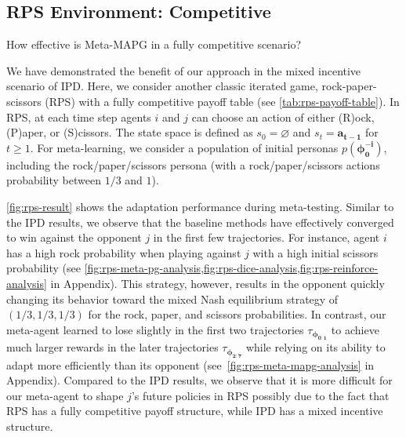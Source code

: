 \subsection{RPS Environment: Competitive}
\begin{question}
How effective is Meta-MAPG in a fully competitive scenario? \\[-2em]
\end{question}
We have demonstrated the benefit of our approach in the mixed incentive scenario of IPD. Here, we consider another classic iterated game, rock-paper-scissors (RPS) with a fully competitive payoff table (see \cref{tab:rps-payoff-table}). 
In RPS, at each time step agents $i$ and $j$ can choose an action of either (R)ock, (P)aper, or (S)cissors. The state space is defined as $s_{0}\!=\!\varnothing$ and $s_{t}\!=\!\bm{a}_{\bm{t-1}}$ for $t\geq1$.
For meta-learning, we consider a population of initial personas $p(\bm{\phi}^{\bm{-i}}_{\bm{0}})$, including the rock/paper/scissors persona (with a rock/paper/scissors actions probability between $1/3$ and $1$).

\cref{fig:rps-result} shows the adaptation performance during meta-testing.
Similar to the IPD results, we observe that the baseline methods have effectively converged to win against the opponent $j$ in the first few trajectories. For instance, agent $i$ has a high rock probability when playing against $j$ with a high initial scissors probability (see \cref{fig:rps-meta-pg-analysis,fig:rps-dice-analysis,fig:rps-reinforce-analysis} in Appendix). 
This strategy, however, results in the opponent quickly changing its behavior toward the mixed Nash equilibrium strategy of $(1/3, 1/3, 1/3)$ for the rock, paper, and scissors probabilities.
In contrast, our meta-agent learned to lose slightly in the first two trajectories $\tau_{\bm{\phi}_{\bm{0:1}}}$ to achieve much larger rewards in the later trajectories $\tau_{\bm{\phi}_{\bm{2:7}}}$ while relying on its ability to adapt more efficiently than its opponent (see~\cref{fig:rps-meta-mapg-analysis} in Appendix).
Compared to the IPD results, we observe that it is more difficult for our meta-agent to shape $j$'s future policies in RPS possibly due to the fact that RPS has a fully competitive payoff structure, while IPD has a mixed incentive structure.

